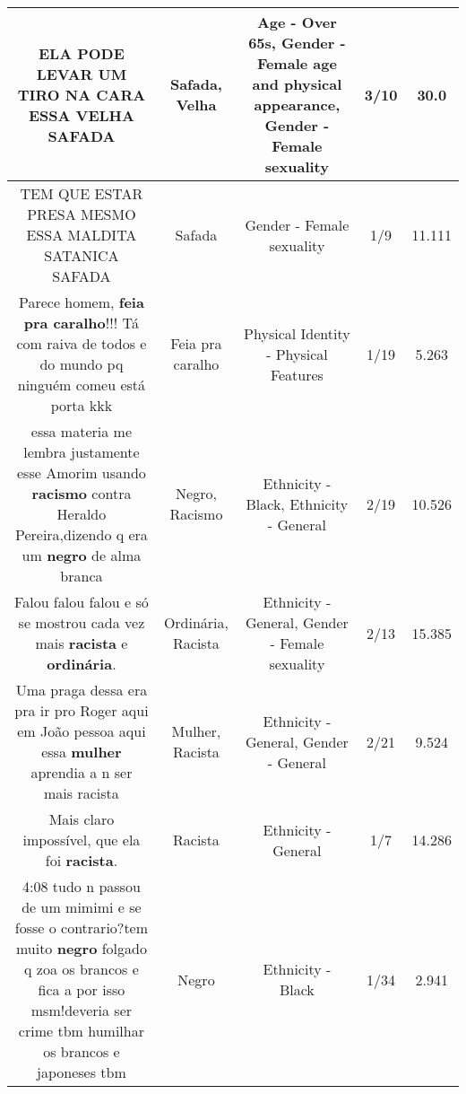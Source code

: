 \documentclass[11pt]{article}
\newlength\mylength
\begin{document}
\begin{center}
\begin{longtable}{|C{.65\mylength}|C{.30\mylength}|C{.12\mylength}|C{.12\mylength}|C{.12\mylength}|}
  \small ELA PODE LEVAR UM TIRO NA CARA ESSA \textbf{V\textbf{ELHA}} SAFADA\normalsize   & Safada, Velha & Age - Over 65s, Gender - Female age and physical appearance, Gender - Female sexuality & 3/10 & 30.0 \\  \hline
  \small TEM QUE ESTAR PRESA MESMO ESSA MALDITA SATANICA SAFADA\normalsize   & Safada & Gender - Female sexuality & 1/9 & 11.111 \\  \hline
  \small Parece homem, \textbf{feia pra caralho}!!! Tá com raiva de todos e do mundo pq ninguém comeu está porta kkk\normalsize   & Feia pra caralho & Physical Identity - Physical Features & 1/19 & 5.263 \\  \hline
  \small essa materia me lembra justamente esse Amorim usando \textbf{racismo} contra Heraldo Pereira,dizendo q era um \textbf{negro} de alma branca\normalsize   & Negro, Racismo & Ethnicity - Black, Ethnicity - General & 2/19 & 10.526 \\  \hline
  \small Falou falou falou e só se mostrou cada vez mais \textbf{racista} e \textbf{ordinária}.\normalsize   & Ordinária, Racista & Ethnicity - General, Gender - Female sexuality & 2/13 & 15.385 \\  \hline
  \small Uma praga dessa era pra ir pro Roger aqui em João pessoa aqui essa \textbf{mulher} aprendia a n ser mais racista\normalsize   & Mulher, Racista & Ethnicity - General, Gender - General & 2/21 & 9.524 \\  \hline
  \small Mais claro impossível, que ela foi \textbf{racista}.\normalsize   & Racista & Ethnicity - General & 1/7 & 14.286 \\  \hline
  \small 4:08 tudo n passou de um mimimi e se fosse o contrario?tem muito \textbf{negro} folgado q zoa os brancos e fica a por isso msm!deveria ser crime tbm humilhar os brancos e japoneses tbm\normalsize   & Negro & Ethnicity - Black & 1/34 & 2.941 \\  \hline

\end{longtable}
\end{center}
\end{document}
